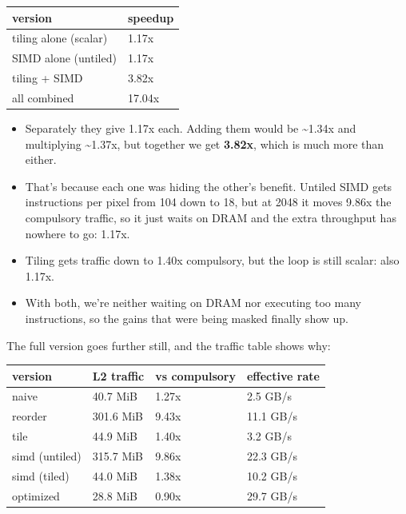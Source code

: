 \documentclass[
  10pt,
]{article}
\newcounter{none} %
\providecommand{\tightlist}{%
  \setlength{\itemsep}{0pt}\setlength{\parskip}{0pt}}
\begin{document}
{\def\LTcaptype{none} %
\begin{longtable}[]{@{}ll@{}}
\toprule\noalign{}
version & speedup \\
\midrule\noalign{}
\endhead
\bottomrule\noalign{}
\endlastfoot
tiling alone (scalar) & 1.17x \\
SIMD alone (untiled) & 1.17x \\
tiling + SIMD & 3.82x \\
all combined & 17.04x \\
\end{longtable}
}

\begin{itemize}
\tightlist
\item
  Separately they give 1.17x each. Adding them would be \textasciitilde1.34x
  and multiplying \textasciitilde1.37x, but together we get \textbf{3.82x},
  which is much more than either.

\item
  That's because each one was hiding the other's benefit. Untiled SIMD gets
  instructions per pixel from 104 down to 18, but at 2048 it moves 9.86x the
  compulsory traffic, so it just waits on DRAM and the extra throughput has
  nowhere to go: 1.17x.

\item
  Tiling gets traffic down to 1.40x compulsory, but the loop is still
  scalar: also 1.17x.

\item
  With both, we're neither waiting on DRAM nor executing too many
  instructions, so the gains that were being masked finally show up.
\end{itemize}

The full version goes further still, and the traffic table shows why:

{\def\LTcaptype{none} %
\begin{longtable}[]{@{}llll@{}}
\toprule\noalign{}
version & L2 traffic & vs compulsory & effective rate \\
\midrule\noalign{}
\endhead
\bottomrule\noalign{}
\endlastfoot
naive & 40.7 MiB & 1.27x & 2.5 GB/s \\
reorder & 301.6 MiB & 9.43x & 11.1 GB/s \\
tile & 44.9 MiB & 1.40x & 3.2 GB/s \\
simd (untiled) & 315.7 MiB & 9.86x & 22.3 GB/s \\
simd (tiled) & 44.0 MiB & 1.38x & 10.2 GB/s \\
optimized & 28.8 MiB & 0.90x & 29.7 GB/s \\
\end{longtable}
}
\end{document}

